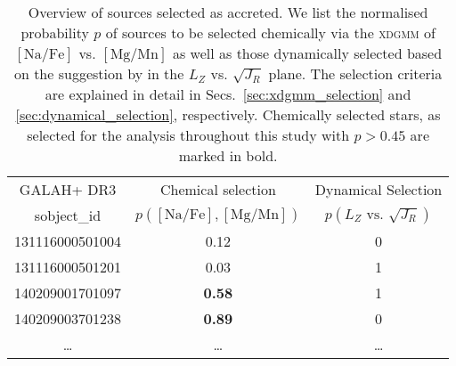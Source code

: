 \begin{table}
\centering
\caption{Overview of sources selected as accreted. We list the normalised probability $p$ of sources to be selected chemically via the \textsc{xdgmm} of $\mathrm{[Na/Fe]}$ vs. $\mathrm{[Mg/Mn]}$ as well as those dynamically selected based on the suggestion by \citet{Feuillet2021} in the $L_Z$ vs. $\sqrt{J_R}$ plane. The selection criteria are explained in detail in Secs.~\ref{sec:xdgmm_selection} and \ref{sec:dynamical_selection}, respectively. Chemically selected stars, as selected for the analysis throughout this study with $p > 0.45$ are marked in bold.}
\label{tab:xdgmm_dynamical_selection}
\setlength{\tabcolsep}{0.6em}
\begin{tabular}{ccc}
\hline
GALAH+ DR3 & Chemical selection & Dynamical Selection \\
sobject\_id & $p (\mathrm{[Na/Fe]},\mathrm{[Mg/Mn]})$ & $p (L_Z\text{ vs. }\sqrt{J_R})$ \\
\hline
131116000501004 & 0.12 & 0 \\
131116000501201 & 0.03 & 1 \\
140209001701097 & \textbf{0.58} & 1 \\
140209003701238 & \textbf{0.89} & 0 \\
\dots  & \dots  & \dots  \\
\hline
\end{tabular}
\end{table}
